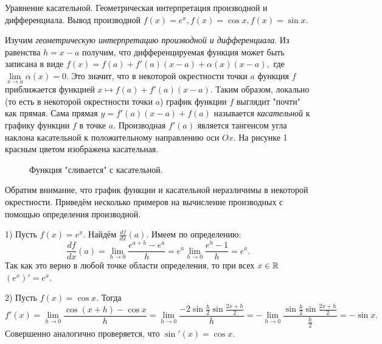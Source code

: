 \newpage

\begin{problem}
Уравнение касательной. Геометрическая интерпретация производной и дифференциала. Вывод производной $f(x) = e^x, f(x) = \cos x, f(x) = \sin x$.
\end{problem}


Изучим
\emph{геометрическую интерпретацию производной
    и дифференциала}.
Из равенства $h=x-a$ получим, что дифференцируемая
функция может быть записана в виде $f(x)=f(a)+
    f'(a)(x-a)+\alpha(x)(x-a),$ где $\lim\limits_{
        x\rightarrow a}\alpha(x)=0.$ Это значит, что в
некоторой окрестности точки $a$ функция $f$
приближается функцией $x\mapsto f(a)+f'(a)(x-a).$
Таким образом, локально (то есть в некоторой
окрестности точки $a$) график функции $f$
выглядит "почти" как прямая. Сама прямая
$y=f'(a)(x-a)+f(a)$ называется
\emph{касательной} к графику функции $f$ в точке
$a.$ Производная $f'(a)$
является тангенсом угла наклона касательной
к положительному направлению оси $Ox.$
На рисунке 1 красным цветом изображена
касательная. \begin{figure}[h!]
    \caption{Функция "сливается" с касательной.}
    \label{fig:image}
\end{figure} Обратим внимание, что
график функции и касательной неразличимы
в некоторой окрестности.
Приведём несколько примеров на вычисление
производных с помощью определения производной.
\begin{example}
    1) Пусть $f(x)=e^x.$
    Найдём $\frac{df}{dx}(a).$
    Имеем по определению:
    $$
        \frac{df}{dx}(a)=\lim\limits_{h\rightarrow0}
        \frac{e^{a+h}-e^a}{h}=e^a\lim\limits_{h\rightarrow0}
        \frac{e^{h}-1}{h}=e^a.
    $$
    Так как это верно в любой
    точке области определения,
    то при всех $x\in\mathbb{R}$
    $(e^x)'=e^x.$

    2) Пусть $f(x)=\cos x.$ Тогда
    $$
        f'(x)=\lim\limits_{h\rightarrow0}
        \frac{\cos(x+h)-\cos x}{h}=
        \lim\limits_{h\rightarrow0}
        \frac{-2\sin\frac{h}{2}\sin\frac{2x+h}{2}}{h}=
        -\lim\limits_{h\rightarrow0}
        \frac{\sin\frac{h}{2}\sin\frac{2x+h}{2}}
        {\frac{h}{2}}=-\sin x.
    $$
    Совершенно аналогично проверяется, что
    $\sin'(x)=\cos x.$\\
\end{example}

